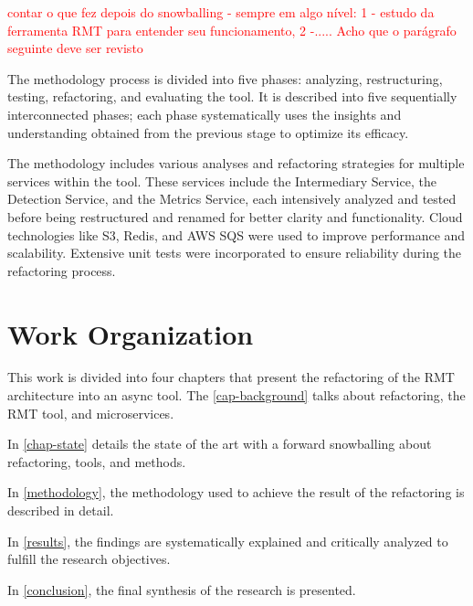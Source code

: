 \textcolor{red}{contar o que fez depois do snowballing - sempre em algo nível: 1 - estudo da ferramenta RMT para entender seu funcionamento, 2 -..... Acho que o parágrafo seguinte deve ser revisto}

The methodology process is divided into five phases: analyzing, restructuring, testing, refactoring, and evaluating the tool. It is described into five sequentially interconnected phases; each phase systematically uses the insights and understanding obtained from the previous stage to optimize its efficacy.
 
The methodology includes various analyses and refactoring strategies for multiple services within the tool. These services include the Intermediary Service, the Detection Service, and the Metrics Service, each intensively analyzed and tested before being restructured and renamed for better clarity and functionality. Cloud technologies like S3, Redis, and AWS SQS were used to improve performance and scalability. Extensive unit tests were incorporated to ensure reliability during the refactoring process.

\section{Work Organization}

This work is divided into four chapters that present the refactoring of the RMT architecture into an async tool. The \cref{cap-background} talks about refactoring, the RMT tool, and microservices.

In \cref{chap-state} details the state of the art with a forward snowballing about refactoring, tools, and methods.

In \cref{methodology}, the methodology used to achieve the result of the refactoring is described in detail.

In \cref{results}, the findings are systematically explained and critically analyzed to fulfill the research objectives.

In \cref{conclusion}, the final synthesis of the research is presented.